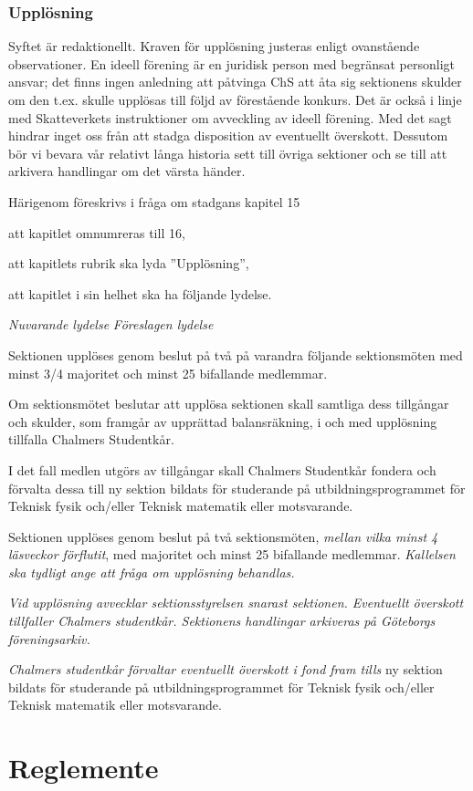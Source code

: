 \documentclass{article}
\newenvironment{lydelse}
    {\begin{paracol}{2}%
        \emph{Nuvarande lydelse}%
        \switchcolumn%
        \emph{Föreslagen lydelse}%
    \end{paracol}%
    \begin{enumerate}[label=\thesubsection.\arabic*]%
    \begin{paracol}{2}%
    }{\end{paracol}\end{enumerate}}
\begin{document}
\section{Upplösning}
Syftet är redaktionellt.
Kraven för upplösning justeras enligt ovanstående observationer.
En ideell förening är en juridisk person med begränsat personligt ansvar; det finns ingen anledning att påtvinga ChS att åta sig sektionens skulder om den t.ex. skulle upplösas till följd av förestående konkurs.
Det är också i linje med Skatteverkets instruktioner om avveckling av ideell förening.
Med det sagt hindrar inget oss från att stadga disposition av eventuellt överskott.
Dessutom bör vi bevara vår relativt långa historia sett till övriga sektioner och se till att arkivera handlingar om det värsta händer.

Härigenom föreskrivs i fråga om stadgans kapitel 15
\begin{dels}
  \item att kapitlet omnumreras till 16,
  \item att kapitlets rubrik ska lyda ''Upplösning'',
  \item att kapitlet i sin helhet ska ha följande lydelse.
\end{dels}
\begin{lydelse}
  \setcounter{section}{15}
  \item Sektionen upplöses genom beslut på två på varandra följande sektionsmöten med minst 3/4 majoritet och minst 25 bifallande medlemmar.
  \item Om sektionsmötet beslutar att upplösa sektionen skall samtliga dess tillgångar och skulder, som framgår av upprättad balansräkning, i och med upplösning tillfalla Chalmers Studentkår.
  \item I det fall medlen utgörs av tillgångar skall Chalmers Studentkår fondera och förvalta dessa till ny sektion bildats för studerande på utbildningsprogrammet för Teknisk fysik och/eller Teknisk matematik eller motsvarande.
  \switchcolumn
  \item Sektionen upplöses genom beslut på två sektionsmöten, \emph{mellan vilka minst 4 läsveckor förflutit}, med  majoritet och minst 25 bifallande medlemmar. \label{maj:up}
  \emph{Kallelsen ska tydligt ange att fråga om upplösning behandlas.} \label{16.0:upplösning}
  \item \emph{Vid upplösning avvecklar sektionsstyrelsen snarast sektionen.
      Eventuellt överskott tillfaller Chalmers studentkår.
      Sektionens handlingar arkiveras på Göteborgs föreningsarkiv.}
  \item \emph{Chalmers studentkår förvaltar eventuellt överskott i fond fram tills} ny sektion bildats för studerande på utbildningsprogrammet för Teknisk fysik och/eller Teknisk matematik eller motsvarande.
\end{lydelse}

\clearpage
\part{Reglemente}
\end{document}
